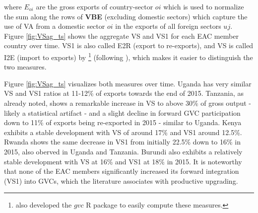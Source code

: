 \documentclass[a4paper]{article}
\begin{document}
where $E_{oi}$ are the gross exports of country-sector $oi$ which is used to normalize the sum along the rows of \textbf{VBE} (excluding domestic sectors) which capture the use of VA from a domestic sector $oi$ in the exports of all foreign sectors $uj$. Figure \ref{fig:VSag_ts} shows the aggregate VS and VS1 for each EAC member country over time. VS1 is also called E2R (export to re-exports), and VS is called I2E (import to exports) by \citet{Kummritz20162}\footnote{\citet{Kummritz20162} also developed the $gvc$ R package to easily compute these measures.} (following \citet{baldwin2015supply}), which makes it easier to distinguish the two measures.   \newline 

Figure \ref{fig:VSag_ts} visualizes both measures over time. Uganda has very similar VS and VS1 ratios at 11-12\% of exports towards the end of 2015. Tanzania, as already noted, shows a remarkable increase in VS to above 30\% of gross output - likely a statistical artifact - and a slight decline in forward GVC participation down to 11\% of exports being re-exported in 2015 - similar to Uganda. Kenya exhibits a stable development with VS of around 17\% and VS1 around 12.5\%. Rwanda shows the same decrease in VS1 from initially 22.5\% down to 16\% in 2015, also oberved in Uganda and Tanzania. Burundi also exhibits a relatively stable development with VS at 16\% and VS1 at 18\% in 2015. It is noteworthy that 
none of the EAC members significantly increased its forward integration (VS1) into GVCs, which the literature associates with productive upgrading. %


\end{document}
